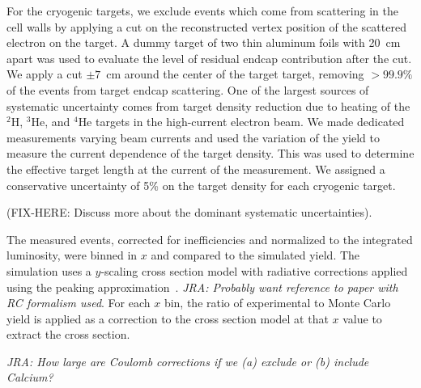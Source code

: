 
For the cryogenic targets, we exclude events which come from scattering in the cell walls by applying a cut on the reconstructed vertex position of
the scattered electron on the target. A dummy target of two thin aluminum foils with 20~cm apart was used to evaluate the level of residual
endcap contribution after the cut. We apply a cut $\pm 7$~cm around the center of the target target, removing $>99.9\%$ of the events from target
endcap scattering. One of the largest sources of systematic uncertainty comes from target density reduction due to heating of the $^2$H, $^3$He,
and $^4$He targets in the high-current electron beam. We made dedicated measurements varying beam currents and used the variation of the yield to
measure the current dependence of the target density. This was used to determine the effective target length at the current of the measurement.
We assigned a conservative uncertainty of 5\% on the target density for each cryogenic target.

(FIX-HERE: Discuss more about the dominant systematic uncertainties).

The measured events, corrected for inefficiencies and normalized to the integrated luminosity, were binned in $x$ and compared to the simulated
yield. The simulation uses a $y$-scaling cross section model with radiative corrections applied using the peaking approximation~\cite{zye_thesis}.
\textit{JRA: Probably want reference to paper with RC formalism used}. For each $x$ bin, the ratio of experimental to Monte Carlo yield is applied
as a correction to the cross section model at that $x$ value to extract the cross section.

\textit{JRA: How large are Coulomb corrections if we (a) exclude or (b) include Calcium?}

%
